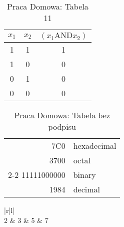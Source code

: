 \documentclass{article}
\begin{document}
	\begin{table}
		\centering
			\begin{tabular}{c|c|c}
				\hline\hline
					$x_{1}$ & $x_{2}$ & $( x_{1} \text{AND} x_{2} )$ \\ \hline
					1 & 1 & 1 \\
					1 & 0 & 0 \\
					0 & 1 & 0 \\
					0 & 0 & 0 \\
					\hline	
					\hline
			\end{tabular}
			\caption{Praca Domowa: Tabela 11}
			\label{tab: 11}
	\end{table}
	
		\begin{table}
		\centering
			\begin{tabular}{|r|l|}
				\hline
					7C0 & hexadecimal \\
					3700 & octal \\ \cline{2-2}
					11111000000 & binary \\
					\hline \hline
					1984 & decimal \\
					\hline
			\end{tabular}
			\caption{Praca Domowa: Tabela bez podpisu}
			\label{tab: bez}
	\end{table}
	
	\begin{table}
		\centering
			\begin{tabular}{|r|l|}
					 \\
					2 & 3 & 5 & 7  \\ 				
			\end{tabular}
			\caption{Praca Domowa: Tabela 15}
			\label{tab: 15}
	\end{table}
\end{document}
